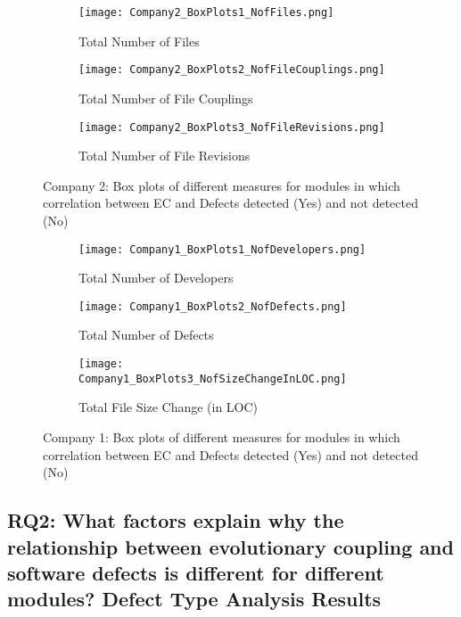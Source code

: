 \documentclass[times]{smrauth}
\begin{document}
\begin{figure}
\begin{subfigure}[b]{0.33\textwidth}
  \texttt{[image: Company2\_BoxPlots1\_NofFiles.png]}
  \caption{Total Number of Files}
  \label{fig:Cmpny2fig1}
\end{subfigure}%
\begin{subfigure}[b]{0.33\textwidth}
  \texttt{[image: Company2\_BoxPlots2\_NofFileCouplings.png]}
  \caption{Total Number of File Couplings}
  \label{fig:Cmpny2fig2}
\end{subfigure}
\begin{subfigure}[b]{0.33\textwidth}
  \texttt{[image: Company2\_BoxPlots3\_NofFileRevisions.png]}
  \caption{Total Number of File Revisions}
  \label{fig:Cmpny2fig3}
\end{subfigure}
\caption{Company 2: Box plots of different measures for modules in which correlation between EC and Defects detected (Yes) and not detected (No)}
\label{fig:Cmpny2BoxPlots}
\end{figure}

\begin{figure}
\begin{subfigure}[b]{0.33\textwidth}
  \texttt{[image: Company1\_BoxPlots1\_NofDevelopers.png]}
  \caption{Total Number of Developers}
  \label{fig:Cmpny1fig4}
\end{subfigure}%
\begin{subfigure}[b]{0.33\textwidth}
  \texttt{[image: Company1\_BoxPlots2\_NofDefects.png]}
  \caption{Total Number of Defects}
  \label{fig:Cmpny1fig5}
\end{subfigure}
\begin{subfigure}[b]{0.33\textwidth}
  \texttt{[image: Company1\_BoxPlots3\_NofSizeChangeInLOC.png]}
  \caption{Total File Size Change (in LOC)}
  \label{fig:Cmpny1fig6}
\end{subfigure}
\caption{Company 1: Box plots of different measures for modules in which correlation between EC and Defects detected (Yes) and not detected (No)}
\label{fig:Cmpny1BoxPlots2}
\end{figure}


\subsection{RQ2: What factors explain why the relationship between evolutionary coupling and software defects is different for different modules? Defect Type Analysis Results} 		
\end{document}
